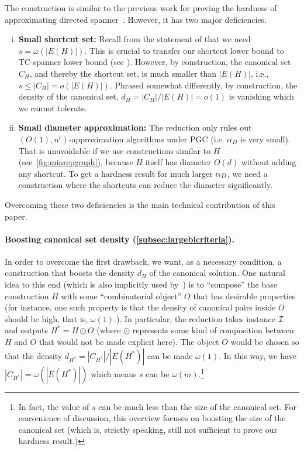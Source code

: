 The construction is similar to the previous work for proving the hardness of approximating directed spanner~\cite{ElkinP07}. 
However, it has two major deficiencies. \begin{enumerate}[(i)]
    \item \textbf{Small shortcut set:} Recall from the statement of  that we need $s = \omega(|E(H)|)$. This is crucial to transfer our shortcut lower bound to TC-spanner lower bound (see ). However, by construction, the canonical set $C_H$, and thereby the shortcut set, is much smaller than $|E(H)|$, i.e., $s \leq |C_H| = o(|E(H)|)$. Phrased somewhat differently, by construction, the density of the canonical set, $d_H  =|C_H|/|E(H)| = o(1)$ is vanishing which we cannot tolerate.
    
    \item \textbf{Small diameter approximation:} The reduction only rules out $(O(1), n^{\epsilon})$-approximation algorithms under PGC (i.e. $\alpha_D$ is very small). That is unavoidable if we use  constructions similar to $H$ (see~\cref{fig:minrepgraph}), because $H$ itself has diameter $O(d)$ without adding any shortcut. To get a hardness result for much larger $\alpha_D$, we need a construction where the shortcuts can reduce the diameter significantly. 
\end{enumerate} 
Overcoming these two deficiencies is the main technical contribution of this paper.

\paragraph{Boosting canonical set density (\cref{subsec:largebicriteria}).} In order to overcome the first drawback, we want, as a necessary condition, a construction that boosts the density $d_H$ of the canonical solution. One natural idea to this end (which is also implicitly used by~\cite{BhattacharyyaGJRW12}) is to ``compose'' the base construction $H$ with some ``combinatorial object'' $O$ that has desirable properties (for instance, one such property is that the density of canonical pairs inside $O$ should be high, that is, $\omega(1)$.).
In particular, the reduction takes \labcov{} instance $\mathcal{I}$ and outputs $H^* = H \odot O$ (where $\odot$ represents some kind of composition between $H$ and $O$ that would not be made explicit here). 
The object $O$ would be chosen so that the density $d_{H^*} = |C_{H^*}|/|E(H^*)|$ can be made $\omega(1)$. In this way, we have $|C_{H^*}|=\omega(|E(H^*)|)$ which means $s$ can be $\omega(m)$.\footnote{In fact, the value of $s$ can be much less than the size of the canonical set. For convenience of discussion, this overview focuses on boosting the size of the canonical set (which is, strictly speaking, still not sufficient to prove our hardness result.)} %




